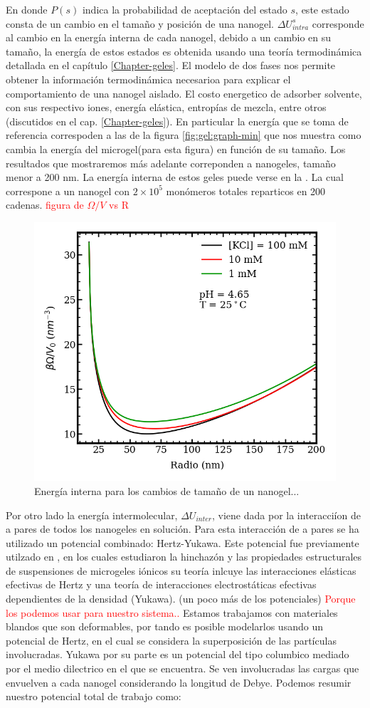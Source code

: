 En donde $P(s)$ indica la probabilidad de aceptaci\'on del estado $s$, este estado consta de un cambio en el tama\~no y posici\'on de una nanogel. $\Delta U^s_{intra}$ corresponde al cambio en la energ\'ia interna de cada nanogel, debido a un cambio en su tama\~no, la energ\'ia de estos estados es obtenida usando una teor\'ia termodin\'amica detallada en el cap\'itulo  \ref{Chapter-geles}. El modelo de dos fases nos permite obtener la informaci\'on termodin\'amica necesarioa para explicar el comportamiento de una nanogel aislado.
El costo energetico de adsorber solvente, con sus respectivo iones, energ\'ia el\'astica, entrop\'ias de mezcla, entre otros (discutidos en el cap. \ref{Chapter-geles}).
En particular la energ\'ia que se toma de referencia correspoden a las de la figura \ref{fig:gel:graph-min} que nos muestra como cambia la energ\'ia del microgel(para esta figura) en funci\'on de su tama\~no.
Los resultados que mostraremos m\'as adelante correponden a nanogeles, tama\~no menor a 200 nm.
La energ\'ia interna de estos geles puede verse en la . La cual correspone a un nanogel con $2\times10^5$ mon\'omeros totales reparticos en 200 cadenas. \textcolor{red}{figura de $\Omega/V$ vs R}

\begin{figure}[!tb]
	\centering
	\includegraphics[width=0.45\linewidth]{Figures/graph-mc/interna.png}
	\caption{Energ\'ia interna para los cambios de tamaño de un nanogel...}
	\label{fig:mc:omega}
\end{figure}


Por otro lado la energ\'ia intermolecular, $\Delta U_{inter}$, viene dada por la interacci\'ion de a pares de todos los nanogeles en soluci\'on. 
Para esta interacci\'on de a pares se ha utilizado un potencial combinado: Hertz-Yukawa. Este potencial fue previamente utilzado en , en los cuales  
estudiaron la hinchaz\'on y las propiedades estructurales de suspensiones de microgeles i\'onicos su teor\'ia inlcuye las interacciones el\'asticas efectivas de Hertz y una teor\'ia de interacciones electrost\'aticas efectivas dependientes de la densidad (Yukawa). 
(un poco m\'as de los potenciales)
\textcolor{red}{Porque los podemos usar para nuestro sistema..}
Estamos trabajamos con materiales blandos que son deformables, por tando es posible modelarlos usando un potencial de Hertz, en el cual se considera la superposici\'on de las part\'iculas involucradas.
Yukawa por su parte es un potencial del tipo columbico mediado por el medio dilectrico en el que se encuentra. Se ven involucradas las cargas que envuelven a cada nanogel considerando la longitud de Debye. 
Podemos resumir nuestro potencial total de trabajo como:

